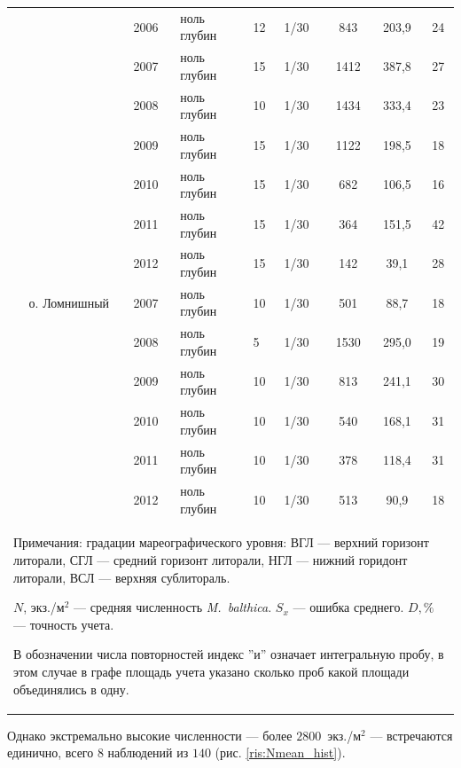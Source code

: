 \begin{footnotesize}
\begin{longtable}{|p{2cm}|p{3cm}|p{1cm}|p{2cm}|p{1.5cm}|p{1cm}|*{3}{c|}}
		 &  & 2006 & ноль глубин & 12 & 1/30 & 843 & 203,9 & 24
		\\ \cline{3-9}
		 &  & 2007 & ноль глубин & 15 & 1/30 & 1412 & 387,8 & 27
		\\ \cline{3-9}
		 &  & 2008 & ноль глубин & 10 & 1/30 & 1434 & 333,4 & 23
		\\ \cline{3-9}
		 &  & 2009 & ноль глубин & 15 & 1/30 & 1122 & 198,5 & 18
		\\ \cline{3-9}
		 &  & 2010 & ноль глубин & 15 & 1/30 & 682 & 106,5 & 16
		\\ \cline{3-9}
		 &  & 2011 & ноль глубин & 15 & 1/30 & 364 & 151,5 & 42
		\\ \cline{3-9}
		 &  & 2012 & ноль глубин & 15 & 1/30 & 142 & 39,1 & 28
		\\ \cline{2-9}
	 & о. Ломнишный & 2007 & ноль глубин & 10 & 1/30 & 501 & 88,7 & 18
		\\ \cline{3-9}
		 &  & 2008 & ноль глубин & 5 & 1/30 & 1530 & 295,0 & 19
		\\ \cline{3-9}
		 &  & 2009 & ноль глубин & 10 & 1/30 & 813 & 241,1 & 30
	\\ \cline{3-9}
	 &  & 2010 & ноль глубин & 10 & 1/30 & 540 & 168,1 & 31
	\\ \cline{3-9}
	 &  & 2011 & ноль глубин & 10 & 1/30 & 378 & 118,4 & 31
	\\ \cline{3-9}
	 &  & 2012 & ноль глубин & 10 & 1/30 & 513 & 90,9 & 18
	\\ \hline
	\multicolumn{9}{p{16cm}}{Примечания: градации мареографического уровня: ВГЛ --- верхний горизонт литорали, СГЛ --- средний горизонт литорали, НГЛ --- нижний горидонт литорали, ВСЛ --- верхняя сублитораль. 

	$N$, экз./м$^2$ --- средняя численность {\it M.~balthica}. 
	$S_x$ --- ошибка среднего.
	 $D, \%$ ---  точность учета.

	В обозначении числа повторностей индекс ''и'' означает интегральную пробу, в этом случае в графе площадь учета указано сколько проб какой площади объединялись в одну.}
	\end{longtable}
	\end{footnotesize}
%
Однако экстремально высокие численности --- более $2800$~экз./м$^2$ --- встречаются единично, всего $8$ наблюдений из $140$ (рис. \ref{ris:Nmean_hist}).
%
